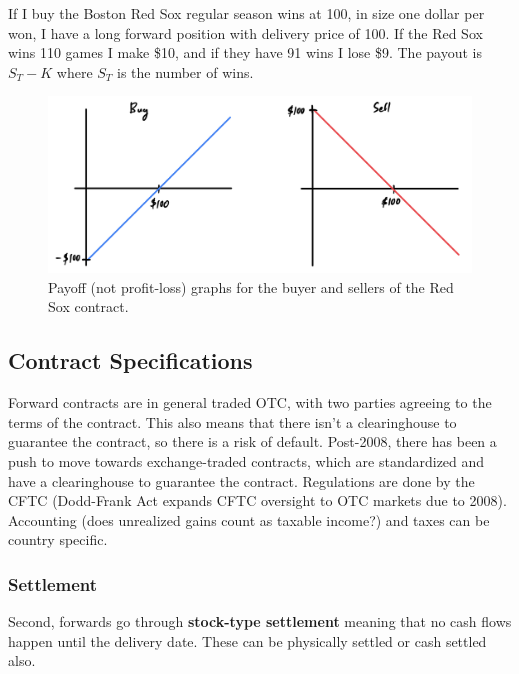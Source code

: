 \documentclass{article}
\begin{document}
    \begin{example}
      If I buy the Boston Red Sox regular season wins at 100, in size one dollar per won, I have a long forward position with delivery price of 100. If the Red Sox wins 110 games I make \$10, and if they have 91 wins I lose \$9. The payout is $S_T - K$ where $S_T$ is the number of wins. 
      \begin{figure}[H]
        \centering 
        \includegraphics[scale=0.4]{img/forward_example.png}
        \caption{Payoff (not profit-loss) graphs for the buyer and sellers of the Red Sox contract. } 
        \label{fig:foward_example}
      \end{figure}
    \end{example}

  \subsection{Contract Specifications}
  
    Forward contracts are in general traded OTC, with two parties agreeing to the terms of the contract. This also means that there isn't a clearinghouse to guarantee the contract, so there is a risk of default. Post-2008, there has been a push to move towards exchange-traded contracts, which are standardized and have a clearinghouse to guarantee the contract. Regulations are done by the CFTC (Dodd-Frank Act expands CFTC oversight to OTC markets due to 2008). Accounting (does unrealized gains count as taxable income?) and taxes can be country specific. 

    \subsubsection{Settlement}

      Second, forwards go through \textbf{stock-type settlement} meaning that no cash flows happen until the delivery date. These can be physically settled or cash settled also. 
\end{document}
